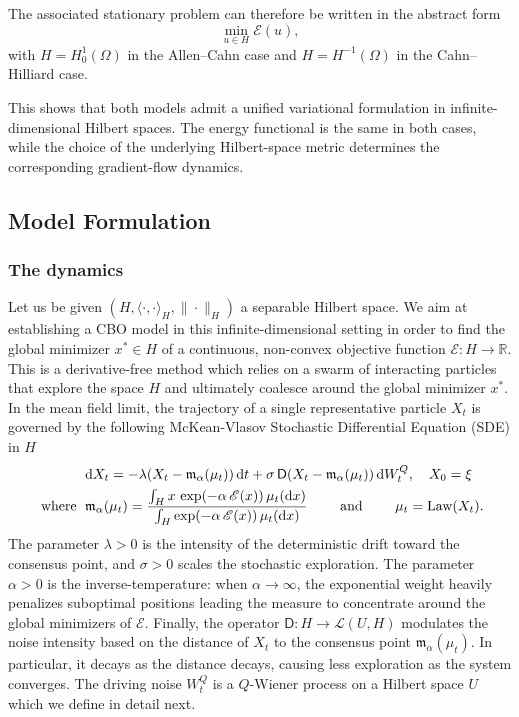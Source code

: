\documentclass[12pt]{amsart}
\newcommand{\D}[1]{\mbox{\rm #1}}
\newcommand{\dd}{\D{d}}
\numberwithin{equation}{section}
\begin{document}
The associated stationary problem can therefore be written in the abstract form
\[
    \min_{u \in H} \mathscr{E}(u),
\]
with $H = H_0^1(\Omega)$ in the Allen--Cahn case and $H = H^{-1}(\Omega)$ in the Cahn--Hilliard case.

This shows that both models admit a unified variational formulation in infinite-dimensional Hilbert spaces. The energy functional is the same in both cases, while the choice of the underlying Hilbert-space metric determines the corresponding gradient-flow dynamics.



\subsection{Model Formulation}\label{sec:model}

\subsubsection{The dynamics}

Let us be given $(H, \langle \cdot, \cdot \rangle_H, \|\cdot\|_H)$ a separable Hilbert space. We aim at establishing a CBO model in this infinite-dimensional setting in order to find the global minimizer $x^*\in H$ of a continuous, non-convex objective function $\mathscr{E}: H\to \mathbb{R}$. This is a derivative-free method which relies on a swarm of interacting particles that explore the space $H$ and ultimately coalesce around the global minimizer $x^*$. 
In the mean field limit, the trajectory of a single representative particle $X_t$ is governed by the following McKean-Vlasov Stochastic Differential Equation (SDE) in $H$
\begin{equation}
\label{eq:mckean_vlasov_cbo}
\begin{aligned}
    & \dd X_t = -\lambda (X_t - \mathfrak{m}_{\alpha}(\mu_t))\,\dd t + \sigma\, \mathsf{D}(X_t- \mathfrak{m}_{\alpha}(\mu_t))\,\dd W_t^{Q}, \quad X_0 = \xi\\
    \text{ where }\; & \mathfrak{m}_{\alpha}(\mu_t) = \frac{\int_{H} x\, \exp(-\alpha\, \mathscr{E}(x))\,\mu_{t}(\dd x)}{\int_{H} \exp(-\alpha\,\mathscr{E}(x))\,\mu_{t}(\dd x)} \qquad \text{ and } \qquad  \mu_t = \text{Law}(X_t).
\end{aligned}
\end{equation} 
The parameter $\lambda>0$ is the intensity of the deterministic drift toward the consensus point, and $\sigma>0$ scales the stochastic exploration. The parameter $\alpha>0$ is the inverse-temperature: when $\alpha\to \infty$, the exponential weight heavily penalizes suboptimal positions leading the measure to concentrate around the global minimizers of $\mathscr{E}$. Finally, the operator $\mathsf{D}:H \to \mathscr{L}(U,H)$ modulates the noise intensity based on the distance of $X_t$ to the consensus point $\mathfrak{m}_{\alpha}(\mu_t)$. In particular, it decays as the distance decays, causing less exploration as the system converges. The driving noise $W_t^Q$ is a $Q$-Wiener process on a Hilbert space $U$ which we define in detail next. 
\end{document}
